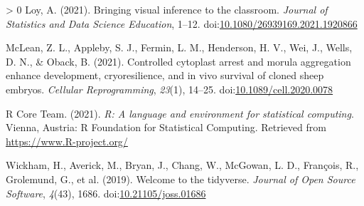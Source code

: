 \documentclass[10pt,a4paper,onecolumn]{article}
\newlength{\cslhangindent}
\newenvironment{CSLReferences}[3] %
 {%
  \setlength{\parindent}{0pt}
  \ifodd #1 \everypar{\setlength{\hangindent}{\cslhangindent}}\ignorespaces\fi
  \ifnum #2 > 0
  \setlength{\parskip}{#2\baselineskip}
  \fi
 }%
 {}
\begin{document}
\begin{CSLReferences}{1}{0}
\leavevmode\hypertarget{ref-loy2021bringing}{}%
Loy, A. (2021). Bringing visual inference to the classroom.
\emph{Journal of Statistics and Data Science Education}, 1--12.
doi:\href{https://doi.org/10.1080/26939169.2021.1920866}{10.1080/26939169.2021.1920866}

\leavevmode\hypertarget{ref-mclean2021controlled}{}%
McLean, Z. L., Appleby, S. J., Fermin, L. M., Henderson, H. V., Wei, J.,
Wells, D. N., \& Oback, B. (2021). Controlled cytoplast arrest and
morula aggregation enhance development, cryoresilience, and in vivo
survival of cloned sheep embryos. \emph{Cellular Reprogramming},
\emph{23}(1), 14--25.
doi:\href{https://doi.org/10.1089/cell.2020.0078}{10.1089/cell.2020.0078}

\leavevmode\hypertarget{ref-CRAN}{}%
R Core Team. (2021). \emph{R: A language and environment for statistical
computing}. Vienna, Austria: R Foundation for Statistical Computing.
Retrieved from \url{https://www.R-project.org/}

\leavevmode\hypertarget{ref-wickham2019welcome}{}%
Wickham, H., Averick, M., Bryan, J., Chang, W., McGowan, L. D.,
François, R., Grolemund, G., et al. (2019). Welcome to the tidyverse.
\emph{Journal of Open Source Software}, \emph{4}(43), 1686.
doi:\href{https://doi.org/10.21105/joss.01686}{10.21105/joss.01686}

\end{CSLReferences}
\end{document}
